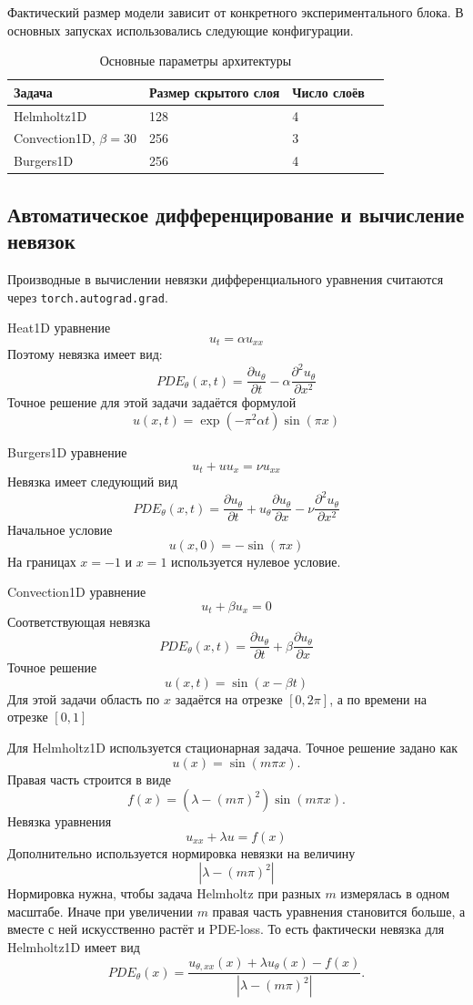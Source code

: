 \documentclass[14pt,a4paper]{extarticle}
\begin{document}
Фактический размер модели зависит от конкретного экспериментального блока. В основных запусках использовались следующие конфигурации.

\begin{table}[H]
\centering
\caption{Основные параметры архитектуры}
\label{tab:model_params_real}
\begin{tabular}{llll}
\hline
Задача & Размер скрытого слоя & Число слоёв \\
\hline
Helmholtz1D & 128 & 4 \\
Convection1D, $\beta=30$ & 256 & 3 \\
Burgers1D & 256 & 4 \\
\hline
\end{tabular}
\end{table}

\subsection{Автоматическое дифференцирование и вычисление невязок}
Производные в вычислении невязки дифференциального уравнения считаются через
 \texttt{torch.autograd.grad}.

Heat1D уравнение
\[
    u_t = \alpha u_{xx}
\]
Поэтому невязка имеет вид:
\[
    PDE_\theta(x,t)
    =
    \frac{\partial u_\theta}{\partial t}
    -
    \alpha
    \frac{\partial^2 u_\theta}{\partial x^2}
\]
Точное решение для этой задачи задаётся формулой
\[
    u(x,t)=\exp(-\pi^2 \alpha t)\sin(\pi x)
\]

Burgers1D уравнение
\[
    u_t + u u_x = \nu u_{xx}
\]
Невязка имеет следующий вид
\[
    PDE_\theta(x,t)
    =
    \frac{\partial u_\theta}{\partial t}
    +
    u_\theta
    \frac{\partial u_\theta}{\partial x}
    -
    \nu
    \frac{\partial^2 u_\theta}{\partial x^2}
\]
Начальное условие
\[
    u(x,0)=-\sin(\pi x)
\]
На границах $x=-1$ и $x=1$ используется нулевое условие.

Convection1D уравнение
\[
    u_t + \beta u_x = 0
\]
Соответствующая невязка
\[
    PDE_\theta(x,t)
    =
    \frac{\partial u_\theta}{\partial t}
    +
    \beta
    \frac{\partial u_\theta}{\partial x}
\]
Точное решение
\[
    u(x,t)=\sin(x-\beta t)
\]
Для этой задачи область по $x$ задаётся на отрезке $[0,2\pi]$, а по времени на отрезке $[0,1]$

Для Helmholtz1D используется стационарная задача. Точное решение задано как
\[
    u(x)=\sin(m\pi x).
\]
Правая часть строится в виде
\[
    f(x) =
    \left(\lambda - (m\pi)^2\right)\sin(m\pi x).
\]
Невязка уравнения
\[
    u_{xx} + \lambda u = f(x)
\]
Дополнительно используется нормировка невязки на величину
\[
    |\lambda - (m\pi)^2|
\]
Нормировка нужна, чтобы задача Helmholtz при разных $m$ измерялась в одном масштабе. Иначе при увеличении $m$ правая часть уравнения становится больше, а вместе с ней искусственно растёт и PDE-loss.
То есть фактически невязка для Helmholtz1D имеет вид
\[
    PDE_\theta(x)
    =
    \frac{
        u_{\theta,xx}(x)
        +
        \lambda u_\theta(x)
        -
        f(x)
    }{
        |\lambda - (m\pi)^2|
    }.
\]
\end{document}
